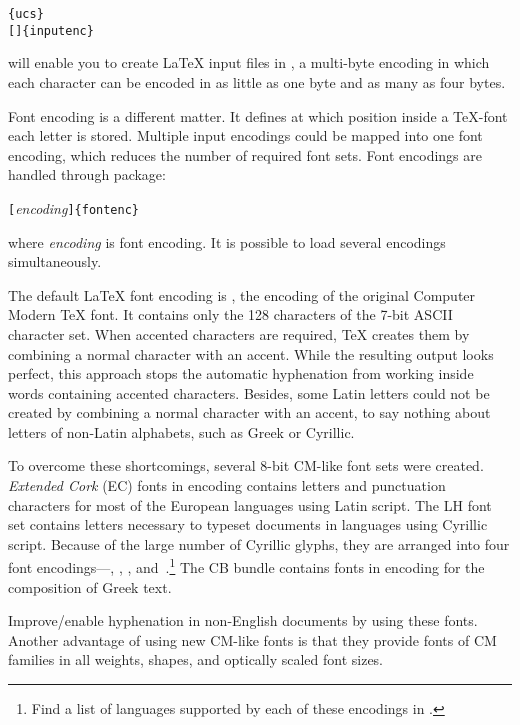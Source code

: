 \begin{lscommand}
\verb|{ucs}|\\ 
\verb|[|\verb|]{inputenc}| 
\end{lscommand}
\noindent will enable you to create \LaTeX{} input files in 
, a multi-byte encoding in which each character can be encoded in
as little as one byte and as many as four bytes. 

Font encoding is a different matter. It defines at which position inside
a \TeX-font each letter is stored. Multiple input encodings could be mapped into 
one font encoding, which reduces the number of required font sets.
Font encodings are handled through 
 package: \label{fontenc}
\begin{lscommand}
\verb|[|\emph{encoding}\verb|]{fontenc}| 
\end{lscommand}
\noindent where \emph{encoding} is font encoding. It is possible to load several
encodings simultaneously.

The default \LaTeX{} font encoding is \label{OT1} , the encoding of the
original Computer Modern \TeX{} font. It contains only the 128
characters of the 7-bit ASCII character set. When accented characters
are required, \TeX{} creates them by combining a normal character with
an accent. While the resulting output looks perfect, this approach stops
the automatic hyphenation from working inside words containing accented
characters. Besides, some Latin letters could not be created by
combining a normal character with an accent, to say nothing about letters of
non-Latin alphabets, such as Greek or Cyrillic.

To overcome these shortcomings, several 8-bit CM-like font sets were created.
\emph{Extended Cork} (EC) fonts in  encoding contains 
letters and punctuation characters for most of the European
languages using Latin script. The LH font set contains letters necessary
to typeset documents in languages using Cyrillic script. Because of the large
number of Cyrillic glyphs, they are arranged into four font
encodings---, , ,
and~.\footnote{Find a list of languages supported by each of these
encodings in \cite{cyrguide}.} The CB bundle contains fonts
in  encoding for the composition of Greek text.

Improve/enable hyphenation in non-English
documents by using these fonts. Another advantage of using new CM-like fonts is that they 
provide fonts of CM families in all weights, shapes, and optically
scaled font sizes. 

